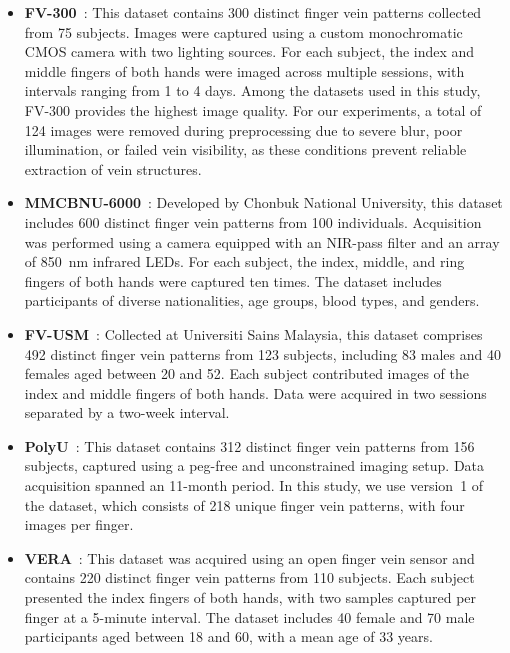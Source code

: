 \documentclass[10pt,journal,compsoc]{IEEEtran}
\begin{document}
\begin{itemize}
    \item \textbf{FV-300}~\cite{veinatnnet}: This dataset contains 300 distinct finger vein patterns collected from 75 subjects. Images were captured using a custom monochromatic CMOS camera with two lighting sources. For each subject, the index and middle fingers of both hands were imaged across multiple sessions, with intervals ranging from 1 to 4 days. Among the datasets used in this study, FV-300 provides the highest image quality. For our experiments, a total of 124 images were removed during preprocessing due to severe blur, poor illumination, or failed vein visibility, as these conditions prevent reliable extraction of vein structures.

    \item \textbf{MMCBNU-6000}~\cite{mmcbnu}: Developed by Chonbuk National University, this dataset includes 600 distinct finger vein patterns from 100 individuals. Acquisition was performed using a camera equipped with an NIR-pass filter and an array of 850~nm infrared LEDs. For each subject, the index, middle, and ring fingers of both hands were captured ten times. The dataset includes participants of diverse nationalities, age groups, blood types, and genders.

    \item \textbf{FV-USM}~\cite{fvusm}: Collected at Universiti Sains Malaysia, this dataset comprises 492 distinct finger vein patterns from 123 subjects, including 83 males and 40 females aged between 20 and 52. Each subject contributed images of the index and middle fingers of both hands. Data were acquired in two sessions separated by a two-week interval.

    \item \textbf{PolyU}~\cite{polyu}: This dataset contains 312 distinct finger vein patterns from 156 subjects, captured using a peg-free and unconstrained imaging setup. Data acquisition spanned an 11-month period. In this study, we use version~1 of the dataset, which consists of 218 unique finger vein patterns, with four images per finger.

    \item \textbf{VERA}~\cite{vera}: This dataset was acquired using an open finger vein sensor and contains 220 distinct finger vein patterns from 110 subjects. Each subject presented the index fingers of both hands, with two samples captured per finger at a 5-minute interval. The dataset includes 40 female and 70 male participants aged between 18 and 60, with a mean age of 33 years.
\end{itemize}
\end{document}
